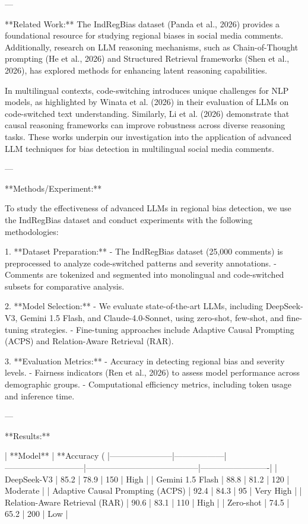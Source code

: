 ---

**Related Work:**  
The IndRegBias dataset (Panda et al., 2026) provides a foundational resource for studying regional biases in social media comments. Additionally, research on LLM reasoning mechanisms, such as Chain-of-Thought prompting (He et al., 2026) and Structured Retrieval frameworks (Shen et al., 2026), has explored methods for enhancing latent reasoning capabilities.  

In multilingual contexts, code-switching introduces unique challenges for NLP models, as highlighted by Winata et al. (2026) in their evaluation of LLMs on code-switched text understanding. Similarly, Li et al. (2026) demonstrate that causal reasoning frameworks can improve robustness across diverse reasoning tasks. These works underpin our investigation into the application of advanced LLM techniques for bias detection in multilingual social media comments.  

---

**Methods/Experiment:**  

To study the effectiveness of advanced LLMs in regional bias detection, we use the IndRegBias dataset and conduct experiments with the following methodologies:  

1. **Dataset Preparation:**  
   - The IndRegBias dataset (25,000 comments) is preprocessed to analyze code-switched patterns and severity annotations.  
   - Comments are tokenized and segmented into monolingual and code-switched subsets for comparative analysis.  

2. **Model Selection:**  
   - We evaluate state-of-the-art LLMs, including DeepSeek-V3, Gemini 1.5 Flash, and Claude-4.0-Sonnet, using zero-shot, few-shot, and fine-tuning strategies.  
   - Fine-tuning approaches include Adaptive Causal Prompting (ACPS) and Relation-Aware Retrieval (RAR).  

3. **Evaluation Metrics:**  
   - Accuracy in detecting regional bias and severity levels.  
   - Fairness indicators (Ren et al., 2026) to assess model performance across demographic groups.  
   - Computational efficiency metrics, including token usage and inference time.  

---

**Results:**  

| **Model**            | **Accuracy (%
|-----------------------|------------------|-----------------------------|-----------------------------------------|-------------------------|  
| DeepSeek-V3          | 85.2             | 78.9                        | 150                                     | High                   |  
| Gemini 1.5 Flash     | 88.8             | 81.2                        | 120                                     | Moderate               |  
| Adaptive Causal Prompting (ACPS) | 92.4   | 84.3                        | 95                                      | Very High              |  
| Relation-Aware Retrieval (RAR)   | 90.6   | 83.1                        | 110                                     | High                   |  
| Zero-shot            | 74.5             | 65.2                        | 200                                     | Low                    |  

